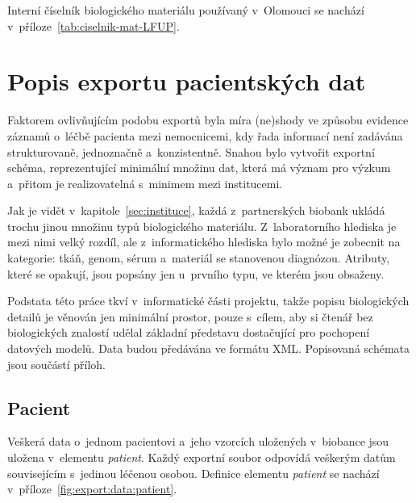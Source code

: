 \documentclass[11pt, final, oneside]{fithesis2}
\begin{document}
Interní číselník biologického materiálu používaný v~Olomouci se nachází v~příloze~\ref{tab:ciselnik-mat-LFUP}.


\section{Popis exportu pacientských dat}

Faktorem ovlivňujícím podobu exportů byla míra (ne)shody ve způsobu evidence záznamů o~léčbě pacienta mezi nemocnicemi, kdy řada informací není zadávána strukturovaně, jednoznačně a~konzistentně. Snahou bylo vytvořit exportní schéma, reprezentující minimální množinu dat, která má význam pro výzkum a~přitom je realizovatelná s~minimem  mezi institucemi.

Jak je vidět v~kapitole~\ref{sec:instituce}, každá z~partnerských biobank ukládá trochu jinou množinu typů biologického materiálu. Z~laboratorního hlediska je mezi nimi velký rozdíl, ale z~informatického hlediska bylo možné je zobecnit na kategorie: tkáň, genom, sérum a~materiál se stanovenou diagnózou. Atributy, které se opakují, jsou popsány jen u~prvního typu, ve kterém jsou obsaženy.

Podstata této práce tkví v~informatické části projektu, takže popisu biologických detailů je věnován jen minimální prostor, pouze s~cílem, aby si čtenář bez biologických znalostí udělal základní představu dostačující pro pochopení datových modelů.
Data budou předávána ve formátu XML. Popisovaná schémata jsou součástí příloh.

\subsection{Pacient}
Veškerá data o~jednom pacientovi a~jeho vzorcích uložených v~biobance jsou uložena v~elementu \textit{patient}. Každý exportní soubor odpovídá veškerým datům souvisejícím s~jedinou léčenou osobou. Definice elementu \textit{patient} se nachází v~příloze~\ref{fig:export:data:patient}.
\end{document}
